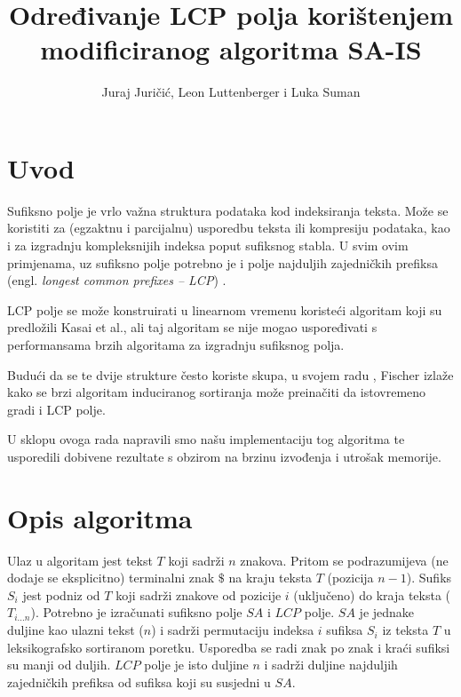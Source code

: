 \documentclass[times, utf8, proizvoljni, numeric]{fer}
\begin{document}
\nocite{*}

\title{Određivanje LCP polja korištenjem modificiranog algoritma SA-IS}

\author{Juraj Juričić, Leon Luttenberger i Luka Suman}

\maketitle

\tableofcontents

\chapter{Uvod}
Sufiksno polje je vrlo važna struktura podataka kod indeksiranja teksta. Može se koristiti za (egzaktnu i parcijalnu) usporedbu teksta ili kompresiju podataka, kao i za izgradnju kompleksnijih indeksa poput sufiksnog stabla. U svim ovim primjenama, uz sufiksno polje potrebno je i polje najduljih zajedničkih prefiksa (engl. \textit{longest common prefixes -- LCP}) \citep{fischer2011inducing}.

LCP polje se može konstruirati u linearnom vremenu koristeći algoritam koji su predložili Kasai et al.\citep{kasai2001linear}, ali taj algoritam se nije mogao uspoređivati s performansama brzih algoritama za izgradnju sufiksnog polja.

Budući da se te dvije strukture često koriste skupa, u svojem radu \citep{fischer2011inducing}, Fischer izlaže kako se brzi algoritam induciranog sortiranja može preinačiti da istovremeno gradi i LCP polje.

U sklopu ovoga rada napravili smo našu implementaciju tog algoritma te usporedili dobivene rezultate s obzirom na brzinu izvođenja i utrošak memorije.

\chapter{Opis algoritma}
Ulaz u algoritam jest tekst $T$ koji sadrži $n$ znakova. Pritom se podrazumijeva (ne dodaje se eksplicitno) terminalni znak $\$$ na kraju teksta $T$ (pozicija $n-1$). Sufiks $S_{i}$ jest podniz od $T$ koji sadrži znakove od pozicije $i$ (uključeno) do kraja teksta ($T_{i...n}$). Potrebno je izračunati sufiksno polje $SA$ i $LCP$ polje. $SA$ je jednake duljine kao ulazni tekst ($n$) i sadrži permutaciju indeksa $i$ sufiksa $S_{i}$ iz teksta $T$ u leksikografsko sortiranom poretku. Usporedba se radi znak po znak i kraći sufiksi su manji od duljih. $LCP$ polje je isto duljine $n$ i sadrži duljine najduljih zajedničkih prefiksa od sufiksa koji su susjedni u $SA$.
\end{document}
